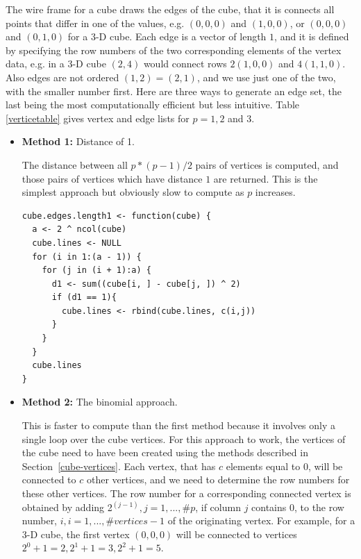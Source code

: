 The wire frame for a cube draws the edges of the cube, that it is
connects all points that differ in one of the values, e.g. $(0,0,0)$
and $(1,0,0)$, or $(0,0,0)$ and $(0,1,0)$ for a 3-D cube. Each edge is
a vector of length $1$, and it is defined by specifying the row
numbers of the two corresponding elements of the vertex data, e.g. in
a 3-D cube $(2,4)$ would connect rows $2 (1,0,0)$ and $4
(1,1,0)$. Also edges are not ordered $(1,2)=(2,1)$, and we use just
one of the two, with the smaller number first. Here are three ways to
generate an edge set, the last being the most computationally
efficient but less intuitive. Table \ref{verticetable} gives vertex
and edge lists for $p=1, 2$ and $3$.

\begin{itemize}

  \item {\bf Method 1:} Distance of 1.

    The distance between all $p * (p - 1) / 2$ pairs of vertices is
    computed, and those pairs of vertices which have distance $1$ are
    returned. This is the simplest approach but obviously slow to
    compute as $p$ increases.

\begin{verbatim}
cube.edges.length1 <- function(cube) {
  a <- 2 ^ ncol(cube)
  cube.lines <- NULL
  for (i in 1:(a - 1)) {
    for (j in (i + 1):a) {
      d1 <- sum((cube[i, ] - cube[j, ]) ^ 2)
      if (d1 == 1){
        cube.lines <- rbind(cube.lines, c(i,j))
      }
    }
  }
  cube.lines
}
\end{verbatim}

  \item {\bf Method 2:} The binomial approach.

    This is faster to compute than the first method because it
    involves only a single loop over the cube vertices. For this
    approach to work, the vertices of the cube need to have been
    created using the methods described in
    Section~\ref{cube-vertices}. Each vertex, that has $c$ elements
    equal to 0, will be connected to $c$ other vertices, and we need
    to determine the row numbers for these other vertices. The row
    number for a corresponding connected vertex is obtained by adding
    2$^{(j-1)}, j=1,...,\#p$, if column $j$ contains 0, to the row
    number, $i, i=1,...,\#vertices-1$ of the originating vertex. For
    example, for a 3-D cube, the first vertex $(0,0,0)$ will be
    connected to vertices $2^0+1=2, 2^1+1=3, 2^2+1=5$.


\end{itemize}
